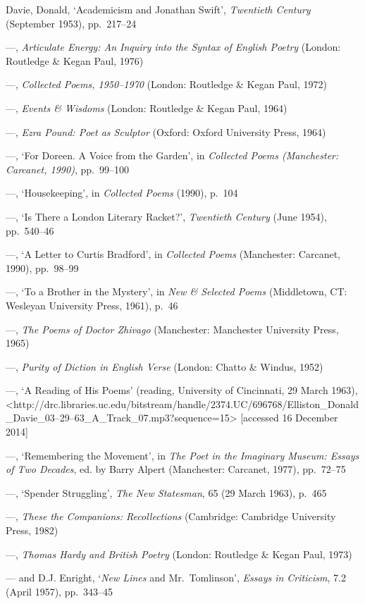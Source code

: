 \documentclass[]{article}
\begin{document}
Davie, Donald, ‘Academicism and Jonathan Swift’, \emph{Twentieth
Century} (September 1953), pp.~217–24

—, \emph{Articulate Energy: An Inquiry into the Syntax of English
Poetry} (London: Routledge \& Kegan Paul, 1976)

—, \emph{Collected Poems, 1950–1970} (London: Routledge \& Kegan Paul,
1972)

—, \emph{Events \& Wisdoms} (London: Routledge \& Kegan Paul, 1964)

—, \emph{Ezra Pound: Poet as Sculptor} (Oxford: Oxford University Press,
1964)

—, ‘For Doreen. A Voice from the Garden’, in \emph{Collected Poems
(Manchester: Carcanet, 1990)}, pp.~99–100

—, ‘Housekeeping’, in \emph{Collected Poems} (1990), p.~104

—, ‘Is There a London Literary Racket?’, \emph{Twentieth Century} (June
1954), pp.~540–46

—, ‘A Letter to Curtis Bradford’, in \emph{Collected Poems} (Manchester:
Carcanet, 1990), pp.~98–99

—, ‘To a Brother in the Mystery’, in \emph{New \& Selected Poems}
(Middletown, CT: Wesleyan University Press, 1961), p.~46

—, \emph{The Poems of Doctor Zhivago} (Manchester: Manchester University
Press, 1965)

—, \emph{Purity of Diction in English Verse} (London: Chatto \& Windus,
1952)

—, ‘A Reading of His Poems’ (reading, University of Cincinnati, 29 March
1963),\\
\textless{}http://drc.libraries.uc.edu/bitstream/handle/2374.UC/696768/Elliston\_Donald\_Davie\_03–29–63\_A\_Track\_07.mp3?sequence=15\textgreater{}
{[}accessed 16 December 2014{]}

—, ‘Remembering the Movement’, in \emph{The Poet in the Imaginary
Museum: Essays of Two Decades}, ed. by Barry Alpert (Manchester:
Carcanet, 1977), pp.~72–75

—, ‘Spender Struggling’, \emph{The New Statesman}, 65 (29 March 1963),
p.~465

—, \emph{These the Companions: Recollections} (Cambridge: Cambridge
University Press, 1982)

—, \emph{Thomas Hardy and British Poetry} (London: Routledge \& Kegan
Paul, 1973)

— and D.J. Enright, ‘\emph{New Lines} and Mr.~Tomlinson’, \emph{Essays
in Criticism}, 7.2 (April 1957), pp.~343–45
\end{document}
